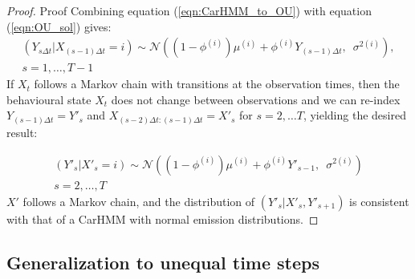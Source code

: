 \begin{proof}{Proof}{}%
Combining equation (\ref{eqn:CarHMM_to_OU}) with equation (\ref{eqn:OU_sol}) gives:
%
\begin{align*}
\left(Y_{s \Delta t} | X_{(s-1)\Delta t} = i \right) \sim \mathcal{N}\left((1-\phi^{(i)}) \mu^{(i)} + \phi^{(i)} Y_{(s-1) \Delta t}, \enspace \sigma^{2(i)} \right),\\
s = 1, \ldots, T-1
\end{align*}
%
If $X_t$ follows a Markov chain with transitions at the observation times, then the behavioural state $X_t$ does not change between observations and we can re-index $Y_{(s-1) \Delta t} = Y'_s$ and $X_{(s-2)\Delta t: (s-1) \Delta t} = X'_s$ for $s = 2,\ldots T$, yielding the desired result:

\begin{align*}
\left(Y'_s| X'_s = i \right) \sim \mathcal{N}\left((1-\phi^{(i)}) \mu^{(i)} + \phi^{(i)} Y'_{s-1}, \enspace \sigma^{2(i)} \right)\\
s = 2, \ldots, T
\end{align*}
%
$X'$ follows a Markov chain, and the distribution of $(Y'_s|X'_s,Y'_{s+1})$ is consistent with that of a CarHMM with normal emission distributions.
\end{proof}





\iffalse

\subsection{Generalization to unequal time steps}

